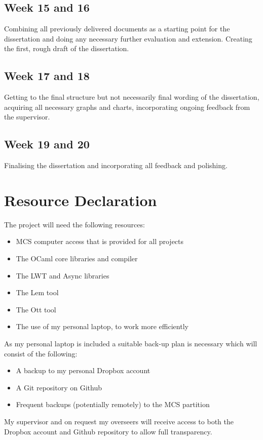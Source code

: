 \subsection{Week 15 and 16}
Combining all previously delivered documents as a starting point for the dissertation and doing any necessary further evaluation and extension.
Creating the first, rough draft of the dissertation.
\subsection{Week 17 and 18}
Getting to the final structure but not necessarily final wording of the dissertation, acquiring all necessary graphs and charts, incorporating ongoing feedback from the supervisor.
\subsection{Week 19 and 20}
Finalising the dissertation and incorporating all feedback and polishing. 
\section{Resource Declaration}
The project will need the following resources:
\begin{itemize}
\item MCS computer access that is provided for all projects
\item The OCaml core libraries and compiler
\item The LWT and Async libraries
\item The Lem tool
\item The Ott tool
\item The use of my personal laptop, to work more efficiently
\end{itemize}

As my personal laptop is included a suitable back-up plan is necessary which will consist of the following:
\begin{itemize}
\item A backup to my personal Dropbox account
\item A Git repository on Github
\item Frequent backups (potentially remotely) to the MCS partition
\end{itemize}
My supervisor and on request my overseers will receive access to both the Dropbox account and Github repository to allow full transparency.


